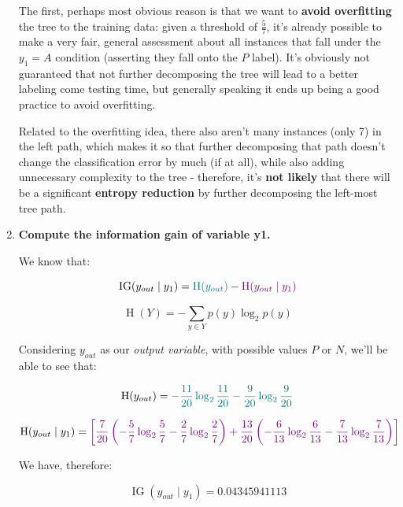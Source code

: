 \documentclass[12pt]{article}
\begin{document}
\begin{enumerate}[leftmargin=\labelsep]
        The first, perhaps most obvious reason is that we want to \textbf{avoid overfitting} the
        tree to the training data: given a threshold of $\frac{5}{7}$, it's already possible
        to make a very fair, general assessment about all instances that fall under the $y_1 = A$
        condition (asserting they fall onto the $P$ label). It's obviously not guaranteed
        that not further decomposing the tree will lead to a better labeling come testing time,
        but generally speaking it ends up being a good practice to avoid overfitting.

        Related to the overfitting idea, there also aren't many instances (only 7) in the
        left path, which makes it so that further decomposing that path doesn't change
        the classification error by much (if at all), while also adding unnecessary
        complexity to the tree - therefore, it's \textbf{not likely} that there will be a significant
        \textbf{entropy reduction} by further decomposing the left-most tree path.

  \item \textbf{Compute the information gain of variable y1.}

        We know that:

        \begin{equation}
          \operatorname{IG}(y_{out} \mid y_1) = \textcolor{teal}{\operatorname{H}(y_{out})} - \textcolor{violet}{\operatorname{H}(y_{out} \mid y_1)}
        \end{equation}

        \begin{equation}
          \operatorname{H}(Y) = -\sum_{y \in Y} p(y) \log_2 p(y)
        \end{equation}

        Considering $y_{out}$ as our \textit{output variable}, with possible values $P$ or $N$,
        we'll be able to see that:

        \begin{equation}
          \operatorname{H}(y_{out}) = \textcolor{teal}{- \frac{11}{20} \log_2 \frac{11}{20} - \frac{9}{20} \log_2 \frac{9}{20}}
        \end{equation}

        \begin{equation}
          \operatorname{H}(y_{out} \mid y_1) = \textcolor{violet}{\left[\frac{7}{20}\left(- {\frac{5}{7}} \log_2 \frac{5}{7} - \frac{2}{7} \log_2 \frac{2}{7}\right) + \frac{13}{20}\left(- \frac{6}{13} \log_2 \frac{6}{13} - \frac{7}{13} \log_2 \frac{7}{13}\right)\right]}
        \end{equation}

        We have, therefore:

        $$
          \operatorname{IG}(y_{out} \mid y_1) = 0.04345941113
        $$

\end{enumerate}
\end{document}
